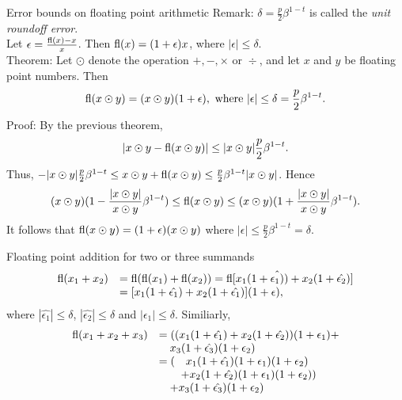 \documentclass{beamer}
\begin{document}
\begin{frame}{Error bounds on floating point arithmetic}
Remark: $\delta = \frac{p}{2} \beta^{1-t}$ is called the \emph{unit roundoff error}.\\
Let $\epsilon = \frac{\text{fl}(x) - x}{x}$. Then $\text{fl}(x) = (1 + \epsilon) x$, where $|\epsilon| \leq \delta$.\\
Theorem: Let $\odot$ denote the operation $+, -, \times \text{ or } \div$, and let $x$ and $y$ be
floating point numbers. Then
\begin{equation*}
\text{fl}(x \odot y) = (x \odot y)(1 + \epsilon), \text{ where } |\epsilon| \leq \delta = \frac{p}{2} \beta^{1-t}.
\end{equation*}
Proof: By the previous theorem,
\begin{equation*}
|x \odot y - \text{fl}(x \odot y)| \leq |x \odot y| \frac{p}{2} \beta^{1-t}.
\end{equation*}
Thus, $-|x \odot y| \frac{p}{2} \beta^{1 - t} \leq x \odot y + \text{fl}(x \odot y) \leq \frac{p}{2} \beta^{1 - t} |x \odot y|$.
Hence
\begin{equation*}
(x \odot y)(1 - \frac{|x \odot y|}{x \odot y} \beta^{1-t}) \leq \text{fl}(x \odot y) \leq (x \odot y)(1 + \frac{|x \odot y|}{x \odot y} \beta^{1-t}).
\end{equation*}
It follows that $\text{fl}(x \odot y) = (1 + \epsilon) (x \odot y)$ where
$|\epsilon| \leq \frac{p}{2} \beta^{1-t} = \delta$.
\end{frame}

\begin{frame}{Floating point addition for two or three summands}
\begin{equation*}
\begin{array}{rl}
\text{fl}(x_1 + x_2) &= \text{fl}(\text{fl}(x_1) + \text{fl}(x_2)) = \text{fl}[x_1(1 + \hat{\epsilon_1)}) + x_2(1 + \hat{\epsilon_2})] \\
&= [x_1 (1 + \hat{\epsilon_1}) + x_2 (1 + \hat{\epsilon_1})] (1 + \epsilon),
\end{array}
\end{equation*}
where
$|\hat{\epsilon_1}| \leq \delta$, $|\hat{\epsilon_2}| \leq \delta$ and $|\epsilon_1| \leq \delta$. Similiarly,
\begin{equation*}
\begin{array}{rl}
\text{fl}(x_1 + x_2 + x_3) &= ((x_1 (1 + \hat{\epsilon_1}) + x_2 (1 + \hat{\epsilon_2}))(1 + \epsilon_1) + \\
& \quad x_3 (1 + \hat{\epsilon_3})(1 + \epsilon_2) \\
& = (\quad x_1 (1 + \hat{\epsilon_1}) (1 + \epsilon_1) (1 + \epsilon_2) \\
	&\qquad + x_2 (1 + \hat{\epsilon_2}) (1 + \epsilon_1) (1 + \epsilon_2)) \\
	&\quad + x_3 (1 + \hat{\epsilon_3}) (1 + \epsilon_2)
\end{array}
\end{equation*}
\end{frame}
\end{document}
